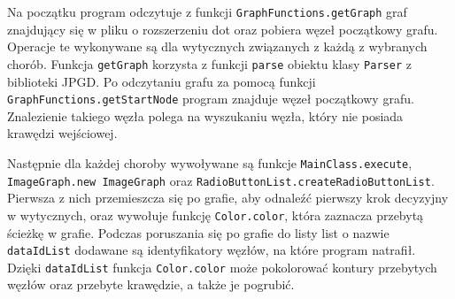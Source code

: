 Na początku program odczytuje z funkcji \texttt{GraphFunctions.getGraph} graf znajdujący się w pliku o rozszerzeniu dot oraz pobiera 
węzeł początkowy grafu. Operacje te wykonywane są dla wytycznych związanych z każdą z wybranych chorób. Funkcja \texttt{getGraph} korzysta z funkcji \texttt{parse} obiektu klasy \texttt{Parser} z biblioteki JPGD. 
Po odczytaniu grafu za pomocą funkcji \texttt{GraphFunctions.getStartNode} program znajduje węzeł początkowy grafu. Znalezienie takiego węzła polega na wyszukaniu węzła, który nie posiada 
krawędzi wejściowej. 

Następnie dla każdej choroby wywoływane są funkcje \texttt{MainClass.execute}, \texttt{ImageGraph.new ImageGraph} oraz \texttt{RadioButtonList.createRadioButtonList}. Pierwsza z nich przemieszcza się po grafie, 
aby odnaleźć pierwszy krok decyzyjny w wytycznych, oraz wywołuje funkcję \texttt{Color.color}, która zaznacza przebytą ścieżkę w grafie. Podczas poruszania się po grafie do listy list o nazwie \texttt{dataIdList} dodawane są identyfikatory węzłów, na które program natrafił. Dzięki \texttt{dataIdList} funkcja \texttt{Color.color} może pokolorować kontury przebytych węzłów oraz przebyte krawędzie, a także je pogrubić. 

